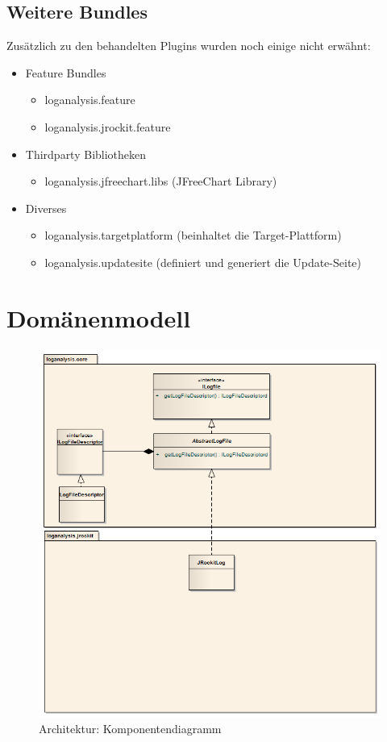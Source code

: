 \subsection{Weitere Bundles}
Zusätzlich zu den behandelten Plugins wurden noch einige nicht erwähnt:

\begin{itemize}
	\item Feature Bundles
		\begin{itemize}
			\item loganalysis.feature
			\item loganalysis.jrockit.feature
		\end{itemize}
	\item Thirdparty Bibliotheken
		\begin{itemize}
			\item  loganalysis.jfreechart.libs (JFreeChart Library)
		\end{itemize}
	\item Diverses
		\begin{itemize}
			\item  loganalysis.targetplatform (beinhaltet die Target-Plattform)
			\item loganalysis.updatesite (definiert und generiert die Update-Seite)
		\end{itemize}
\end{itemize}

\section{Domänenmodell}
 \begin{figure}[H]
  	\centering
        	\caption{Architektur: Komponentendiagramm}
    	\includegraphics[width=15.5cm]{images/domainmodel_basic}
\end{figure}
